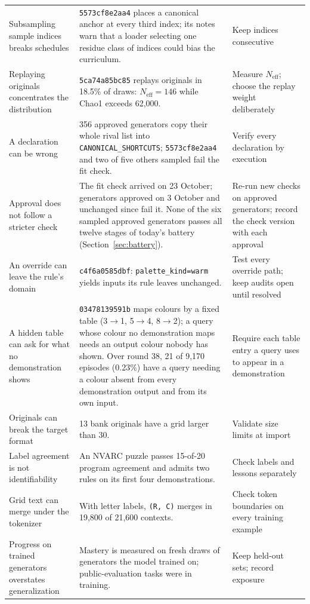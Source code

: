 \documentclass[11pt]{article}
\newcommand{\gen}[1]{\texttt{#1}}
\begin{document}
{\begin{xltabular}{\linewidth}{>{\raggedright\arraybackslash}p{3.5cm}X>{\raggedright\arraybackslash}p{3.3cm}}
\addlinespace
Subsampling sample indices breaks schedules & \gen{5573cf8e2aa4} places a canonical anchor at every third index; its notes warn that a loader selecting one residue class of indices could bias the curriculum. & Keep indices consecutive \\
\addlinespace
Replaying originals concentrates the distribution & \gen{5ca74a85bc85} replays originals in 18.5\% of draws: $N_{\mathrm{eff}}=146$ while Chao1 exceeds 62,000. & Measure $N_{\mathrm{eff}}$; choose the replay weight deliberately \\
\addlinespace
A declaration can be wrong & 356 approved generators copy their whole rival list into \texttt{CANONICAL\_SHORTCUTS}; \gen{5573cf8e2aa4} and two of five others sampled fail the fit check. & Verify every declaration by execution \\
\addlinespace
Approval does not follow a stricter check & The fit check arrived on 23 October; generators approved on 3 October and unchanged since fail it. None of the six sampled approved generators passes all twelve stages of today's battery (Section~\ref{sec:battery}). & Re-run new checks on approved generators; record the check version with each approval \\
\addlinespace
An override can leave the rule's domain & \gen{c4f6a0585dbf}: \texttt{palette\_kind=warm} yields inputs its rule leaves unchanged. & Test every override path; keep audits open until resolved \\
\addlinespace
A hidden table can ask for what no demonstration shows & \gen{03478139591b} maps colours by a fixed table (3$\to$1, 5$\to$4, 8$\to$2); a query whose colour no demonstration maps needs an output colour nobody has shown. Over round 38, 21 of 9,170 episodes (0.23\%) have a query needing a colour absent from every demonstration output and from its own input. & Require each table entry a query uses to appear in a demonstration \\
\addlinespace
Originals can break the target format & 13 bank originals have a grid larger than 30. & Validate size limits at import \\
\addlinespace
Label agreement is not identifiability & An NVARC puzzle passes 15-of-20 program agreement and admits two rules on its first four demonstrations. & Check labels and lessons separately \\
\addlinespace
Grid text can merge under the tokenizer & With letter labels, \texttt{(R, C)} merges in 19,800 of 21,600 contexts. & Check token boundaries on every training example \\
\addlinespace
Progress on trained generators overstates generalization & Mastery is measured on fresh draws of generators the model trained on; public-evaluation tasks were in training. & Keep held-out sets; record exposure \\
\bottomrule
\end{xltabular}}
\end{document}
